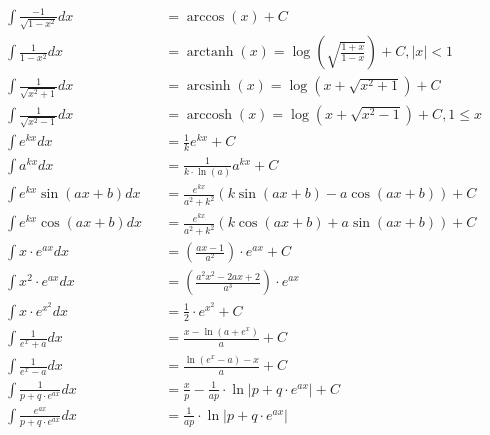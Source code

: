 \begin{footnotesize}
\begin{align*}
         & \int \frac{-1}{\sqrt{1-x^2}}dx        &  & =\arccos(x)+C                                                                     \\
         & \int \frac{1}{1-x^2}dx                &  & =\operatorname{arctanh}(x)=\log(\sqrt{\frac{1+x}{1-x}})+C, \vert x \vert < 1      \\
         & \int \frac{1}{\sqrt{x^2+1}}dx         &  & =\operatorname{arcsinh}(x)=\log(x+\sqrt{x^2+1})+C                                 \\
         & \int \frac{1}{\sqrt{x^2-1}}dx         &  & =\operatorname{arccosh}(x)=\log(x+\sqrt{x^2-1})+C, 1 \leq x                       \\
         & \int e^{kx}dx                         &  & =\frac{1}{k}e^{kx}+C                                                              \\
         & \int a^{kx}dx                         &  & =\frac{1}{k\cdot \ln(a)}a^{kx}+C                                                  \\
         & \int e^{kx}\sin(ax+b)dx               &  & =\frac{e^{kx}}{a^2+k^2}\left(k\sin(ax+b)-a\cos(ax+b)\right)+C                     \\
         & \int e^{kx}\cos(ax+b)dx               &  & =\frac{e^{kx}}{a^2+k^2}\left(k\cos(ax+b)+a\sin(ax+b)\right)+C                     \\
         & \int x \cdot e^{ax}dx                 &  & =(\frac{ax-1}{a^2})\cdot e^{ax}+C                                                 \\
         & \int x^2 \cdot e^{ax}dx               &  & =(\frac{a^2x^2-2ax+2}{a^3})\cdot e^{ax}                                           \\
         & \int x\cdot e^{x^2}dx                 &  & =\frac{1}{2}\cdot e^{x^2}+C                                                       \\
         & \int \frac{1}{e^x+a}dx                &  & =\frac{x-\ln(a+e^x)}{a}+C                                                         \\
         & \int \frac{1}{e^x-a}dx                &  & =\frac{\ln(e^x-a)-x}{a}+C                                                         \\
         & \int \frac{1}{p+q\cdot e^{ax}}dx      &  & =\frac{x}{p}-\frac{1}{ap}\cdot \ln\vert p+q\cdot e^{ax}\vert+C                    \\
         & \int \frac{e^{ax}}{p+q\cdot e^{ax}}dx &  & =\frac{1}{ap}\cdot \ln\vert p+q\cdot e^{ax}\vert                                  \\

\end{align*}
\end{footnotesize}
